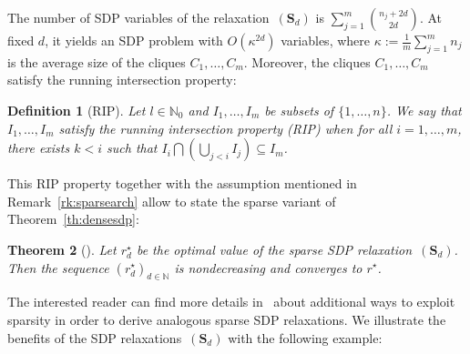 \documentclass[preprint]{sigplanconf}
\newcommand{\N}{\mathbb{N}}
\def\S{\mathbf{S}}
\def\S{\mathbf{S}}
\newtheorem{theorem}{Theorem}[section]
\theoremstyle{plain}
\newtheorem{definition}[theorem]{Definition}
\begin{document}
The number of SDP variables of the relaxation~$(\S_d)$ is $\sum_{j=1}^m \binom{n_j + 2 d}{2 d}$. At fixed $d$, it yields an SDP problem with $O(\kappa^{2d})$ variables, where $\kappa := \frac{1}{m} \sum_{j=1}^m n_j$ is the average size of the cliques $C_1, \dots, C_m$.
%
Moreover, the cliques $C_1, \dots, C_m$ satisfy the running intersection property: 
%
\begin{definition}[RIP]
\label{def:rip}
Let $l \in \N_0$  and $I_1, \dots, I_m$ be subsets of $\{1, \dots, n\}$. We say that $I_1, \dots, I_m$ satisfy the running intersection property (RIP) when for all $i=1, \dots, m$, there exists $k < i$ such that $I_i \bigcap (\bigcup_{j < i} I_j) \subseteq I_m$.
\end{definition}
This RIP property together with the assumption mentioned in Remark~\ref{rk:sparsearch} allow to state the sparse variant of Theorem~\ref{th:densesdp}:
%
\begin{theorem}[]
\label{th:sparsesdp}
Let $r_d^{\star}$ be the optimal value of the sparse SDP relaxation~$(\S_d)$. Then the sequence $(r_d^{\star})_{d \in \N}$ is nondecreasing and converges to $r^\star$.
\end{theorem}
The interested reader can find more details in~\cite{Waki06SparseSOS} about additional ways to exploit sparsity in order to derive analogous sparse SDP relaxations.
We illustrate the benefits of the SDP relaxations~$(\S_d)$ with the following example:
\end{document}
